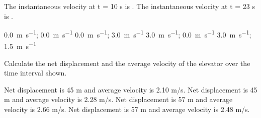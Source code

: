 \documentclass[]{exam}
\begin{document}
\begin{questions}
\begin{questions}
\question \label{ques:Unit02_Elevator1}

The instantaneous velocity at t = 10 s is \underline{\hspace{2cm}}. The instantaneous velocity at t = 23 s is \underline{\hspace{2cm}}.

\begin{choices}
\choice \SI[per-mode=symbol]{0.0}{\meter\per\second}; \SI[per-mode=symbol]{0.0}{\meter\per\second}
\choice \SI[per-mode=symbol]{0.0}{\meter\per\second}; \SI[per-mode=symbol]{3.0}{\meter\per\second}
\CorrectChoice \SI[per-mode=symbol]{3.0}{\meter\per\second}; \SI[per-mode=symbol]{0.0}{\meter\per\second}
\choice \SI[per-mode=symbol]{3.0}{\meter\per\second}; \SI[per-mode=symbol]{1.5}{\meter\per\second}
\end{choices}

\question \label{ques:Unit02_Elevator2}

Calculate the net displacement and the average velocity of the elevator over the time interval shown.

\begin{choices}
\choice Net displacement is 45 m and average velocity is 2.10 m/s.
\choice Net displacement is 45 m and average velocity is 2.28 m/s.
\choice Net displacement is 57 m and average velocity is 2.66 m/s.
\CorrectChoice Net displacement is 57 m and average velocity is 2.48 m/s.
\end{choices}





\end{questions}







\end{questions}
\end{document}
